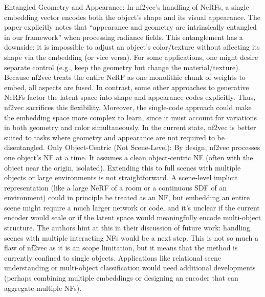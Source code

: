 \documentclass[11pt]{article}
\begin{document}
Entangled Geometry and Appearance: In nf2vec’s handling of NeRFs, a single embedding vector encodes both the object’s shape and its visual appearance. The paper explicitly notes that “appearance and geometry are intrinsically entangled in our framework” when processing radiance fields. This entanglement has a downside: it is impossible to adjust an object’s color/texture without affecting its shape via the embedding (or vice versa). For some applications, one might desire separate control (e.g., keep the geometry but change the material/texture). Because nf2vec treats the entire NeRF as one monolithic chunk of weights to embed, all aspects are fused. In contrast, some other approaches to generative NeRFs factor the latent space into shape and appearance codes explicitly. Thus, nf2vec sacrifices this flexibility. Moreover, the single-code approach could make the embedding space more complex to learn, since it must account for variations in both geometry and color simultaneously. In the current state, nf2vec is better suited to tasks where geometry and appearance are not required to be disentangled.
Only Object-Centric (Not Scene-Level): By design, nf2vec processes one object’s NF at a time. It assumes a clean object-centric NF (often with the object near the origin, isolated). Extending this to full scenes with multiple objects or large environments is not straightforward. A scene-level implicit representation (like a large NeRF of a room or a continuous SDF of an environment) could in principle be treated as an NF, but embedding an entire scene might require a much larger network or code, and it’s unclear if the current encoder would scale or if the latent space would meaningfully encode multi-object structure. The authors hint at this in their discussion of future work: handling scenes with multiple interacting NFs would be a next step. This is not so much a flaw of nf2vec as it is an scope limitation, but it means that the method is currently confined to single objects. Applications like relational scene understanding or multi-object classification would need additional developments (perhaps combining multiple embeddings or designing an encoder that can aggregate multiple NFs).
\end{document}
